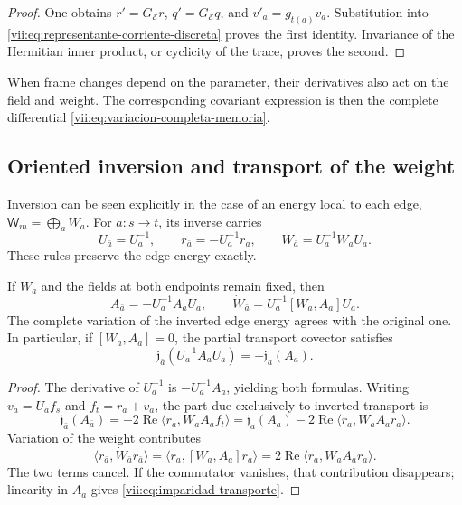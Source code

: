 \begin{proof}
One obtains \(r'=G_{\mathcal E}r\), \(q'=G_{\mathcal E}q\), and
\(v'_a=g_{t(a)}v_a\). Substitution into
\eqref{vii:eq:representante-corriente-discreta} proves the first
identity. Invariance of the Hermitian inner product, or cyclicity of
the trace, proves the second.
\end{proof}

When frame changes depend on the parameter, their derivatives
also act on the field and weight. The corresponding covariant
expression is then the complete differential
\eqref{vii:eq:variacion-completa-memoria}.

\subsection{Oriented inversion and transport of the weight}
\label{vii:subsec:inversion-respuesta}

Inversion can be seen explicitly in the case of an energy
local to each edge, \(\mathsf W_m=\bigoplus_a W_a\).
For \(a:s\to t\), its inverse carries
\[
 U_{\bar a}=U_a^{-1},\qquad
 r_{\bar a}=-U_a^{-1}r_a,\qquad
 W_{\bar a}=U_a^{-1}W_aU_a.
\]
These rules preserve the edge energy exactly.

\begin{proposition}
\label{vii:prop:inversion-respuesta}
If \(W_a\) and the fields at both endpoints remain fixed, then
\[
 A_{\bar a}=-U_a^{-1}A_aU_a,\qquad
 \dot W_{\bar a}=U_a^{-1}[W_a,A_a]U_a.
\]
The complete variation of the inverted edge energy agrees with
the original one. In particular, if \([W_a,A_a]=0\), the partial
transport covector satisfies
\begin{equation}
 \mathfrak j_{\bar a}(U_a^{-1}A_aU_a)
 =-\mathfrak j_a(A_a).
 \label{vii:eq:imparidad-transporte}
\end{equation}
\end{proposition}

\begin{proof}
The derivative of \(U_a^{-1}\) is \(-U_a^{-1}A_a\), yielding
both formulas. Writing \(v_a=U_af_s\) and \(f_t=r_a+v_a\),
the part due exclusively to inverted transport is
\[
 \mathfrak j_{\bar a}(A_{\bar a})
 =-2\operatorname{Re}\langle r_a,W_aA_af_t\rangle
 =\mathfrak j_a(A_a)
   -2\operatorname{Re}\langle r_a,W_aA_ar_a\rangle.
\]
Variation of the weight contributes
\[
 \langle r_{\bar a},\dot W_{\bar a}r_{\bar a}\rangle
 =\langle r_a,[W_a,A_a]r_a\rangle
 =2\operatorname{Re}\langle r_a,W_aA_ar_a\rangle.
\]
The two terms cancel. If the commutator vanishes, that contribution
disappears; linearity in \(A_a\) gives
\eqref{vii:eq:imparidad-transporte}.
\end{proof}

